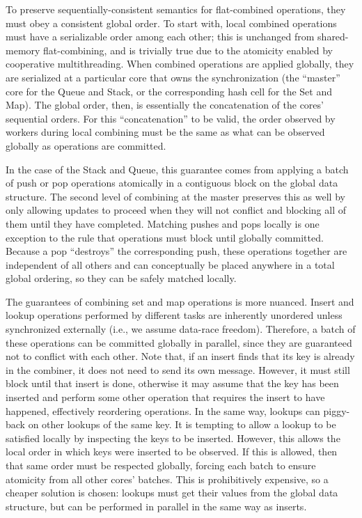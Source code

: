 To preserve sequentially-consistent semantics for flat-combined operations, they must obey a consistent global order.
To start with, local combined operations must have a serializable order among each other; this is unchanged from shared-memory flat-combining, and is trivially true due to the atomicity enabled by cooperative multithreading.
When combined operations are applied globally, they are serialized at a particular core that owns the synchronization (the ``master'' core for the Queue and Stack, or the corresponding hash cell for the Set and Map). The global order, then, is essentially the concatenation of the cores' sequential orders.
For this ``concatenation'' to be valid, the order observed by workers during local combining must be the same as what can be observed globally as operations are committed.

In the case of the Stack and Queue, this guarantee comes from applying a batch of push or pop operations atomically in a contiguous block on the global data structure. The second level of combining at the master preserves this as well by only allowing updates to proceed when they will not conflict and blocking all of them until they have completed.
Matching pushes and pops locally is one exception to the rule that operations must block until globally committed. Because a pop ``destroys'' the corresponding push, these operations together are independent of all others and can conceptually be placed anywhere in a total global ordering, so they can be safely matched locally.

The guarantees of combining set and map operations is more nuanced.
Insert and lookup operations performed by different tasks are inherently unordered unless synchronized externally (i.e., we assume data-race freedom).
Therefore, a batch of these operations can be committed globally in parallel, since they are guaranteed not to conflict with each other.
Note that, if an insert finds that its key is already in the combiner, it does not need to send its own message. However, it must still block until that insert is done, otherwise it may assume that the key has been inserted and perform some other operation that requires the insert to have happened, effectively reordering operations.
In the same way, lookups can piggy-back on other lookups of the same key.
It is tempting to allow a lookup to be satisfied locally by inspecting the keys to be inserted.
However, this allows the local order in which keys were inserted to be observed.
If this is allowed, then that same order must be respected globally, forcing each batch to ensure atomicity from all other cores' batches. This is prohibitively expensive, so a cheaper solution is chosen: lookups must get their values from the global data structure, but can be performed in parallel in the same way as inserts.

